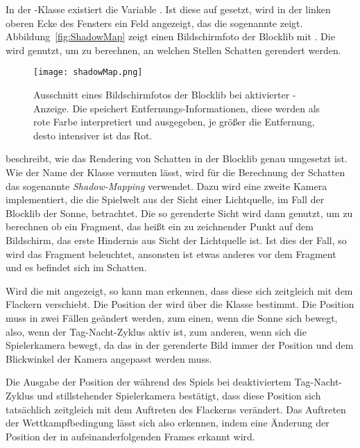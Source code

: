 In der \classConfiguration{}-Klasse existiert die Variable . Ist diese auf  gesetzt, wird in der linken oberen Ecke des Fensters ein Feld angezeigt, das die sogenannte \classShadowMap{} zeigt. Abbildung~\vref{fig:ShadowMap} zeigt einen Bildschirmfoto der Blocklib mit . Die \classShadowMap{} wird genutzt, um zu berechnen, an welchen Stellen Schatten gerendert werden.
\begin{figure}
	\centering
	\texttt{[image: shadowMap.png]}
	\caption[Ausschnitt eines Bildschirmfotos der Blocklib bei aktivierter \classShadowMap{}-Anzeige.]{Ausschnitt eines Bildschirmfotos der Blocklib bei aktivierter \classShadowMap{}-Anzeige. Die \classShadowMap{} speichert Entfernungs-Informationen, diese werden als rote Farbe interpretiert und ausgegeben, je größer die Entfernung, desto intensiver ist das Rot.}\label{fig:ShadowMap}
\end{figure}
\textcite{Ebbinger2018} beschreibt, wie das Rendering von Schatten in der Blocklib genau umgesetzt ist. Wie der Name der Klasse \classShadowMap{} vermuten lässt, wird für die Berechnung der Schatten das sogenannte \emph{Shadow-Mapping} verwendet. Dazu wird eine zweite Kamera implementiert, die die Spielwelt aus der Sicht einer Lichtquelle, im Fall der Blocklib der Sonne, betrachtet. Die so gerenderte Sicht wird dann genutzt, um zu berechnen ob ein Fragment, das heißt ein zu zeichnender Punkt auf dem Bildschirm, das erste Hindernis aus Sicht der Lichtquelle ist. Ist dies der Fall, so wird das Fragment beleuchtet, ansonsten ist etwas anderes vor dem Fragment und es befindet sich im Schatten.

Wird die \classShadowMap{} mit angezeigt, so kann man erkennen, dass diese sich zeitgleich mit dem Flackern verschiebt. Die Position der \classShadowMap{} wird über die Klasse \classShadowBounds{} bestimmt. Die Position muss in zwei Fällen geändert werden, zum einen, wenn die Sonne sich bewegt, also, wenn der Tag-Nacht-Zyklus aktiv ist, zum anderen, wenn sich die Spielerkamera bewegt, da das in der \classShadowMap{} gerenderte Bild immer der Position und dem Blickwinkel der Kamera angepasst werden muss.

Die Ausgabe der Position der \classShadowBounds{} während des Spiels bei deaktiviertem Tag-Nacht-Zyklus und stillstehender Spielerkamera bestätigt, dass diese Position sich tatsächlich zeitgleich mit dem Auftreten des Flackerns verändert. Das Auftreten der Wettkampfbedingung lässt sich also erkennen, indem eine Änderung der Position der \classShadowBounds{} in aufeinanderfolgenden Frames erkannt wird.

